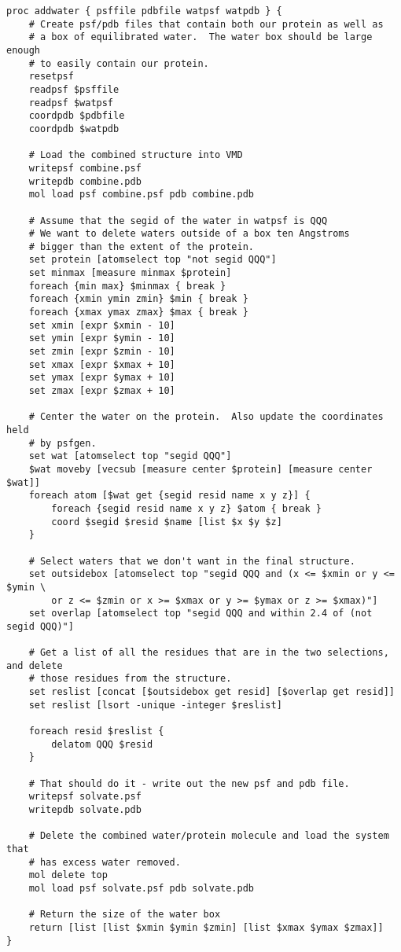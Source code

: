 \begin{verbatim}
proc addwater { psffile pdbfile watpsf watpdb } {
	# Create psf/pdb files that contain both our protein as well as
	# a box of equilibrated water.  The water box should be large enough
	# to easily contain our protein.
	resetpsf
	readpsf $psffile
	readpsf $watpsf
	coordpdb $pdbfile
	coordpdb $watpdb

	# Load the combined structure into VMD   
	writepsf combine.psf
	writepdb combine.pdb
	mol load psf combine.psf pdb combine.pdb

	# Assume that the segid of the water in watpsf is QQQ
	# We want to delete waters outside of a box ten Angstroms
	# bigger than the extent of the protein. 
	set protein [atomselect top "not segid QQQ"]
	set minmax [measure minmax $protein]
	foreach {min max} $minmax { break }
	foreach {xmin ymin zmin} $min { break }
	foreach {xmax ymax zmax} $max { break }
    set xmin [expr $xmin - 10]
    set ymin [expr $ymin - 10]
    set zmin [expr $zmin - 10]
    set xmax [expr $xmax + 10]
    set ymax [expr $ymax + 10]
    set zmax [expr $zmax + 10]

	# Center the water on the protein.  Also update the coordinates held
	# by psfgen.
	set wat [atomselect top "segid QQQ"]
	$wat moveby [vecsub [measure center $protein] [measure center $wat]]
	foreach atom [$wat get {segid resid name x y z}] {
		foreach {segid resid name x y z} $atom { break }
		coord $segid $resid $name [list $x $y $z]
	}

	# Select waters that we don't want in the final structure.
	set outsidebox [atomselect top "segid QQQ and (x <= $xmin or y <= $ymin \
		or z <= $zmin or x >= $xmax or y >= $ymax or z >= $xmax)"]
	set overlap [atomselect top "segid QQQ and within 2.4 of (not segid QQQ)"]

	# Get a list of all the residues that are in the two selections, and delete
	# those residues from the structure.
	set reslist [concat [$outsidebox get resid] [$overlap get resid]]
	set reslist [lsort -unique -integer $reslist]

	foreach resid $reslist {
		delatom QQQ $resid
	}

	# That should do it - write out the new psf and pdb file. 
	writepsf solvate.psf 
	writepdb solvate.pdb

	# Delete the combined water/protein molecule and load the system that
	# has excess water removed.
	mol delete top
	mol load psf solvate.psf pdb solvate.pdb

	# Return the size of the water box
	return [list [list $xmin $ymin $zmin] [list $xmax $ymax $zmax]]
}
\end{verbatim}

